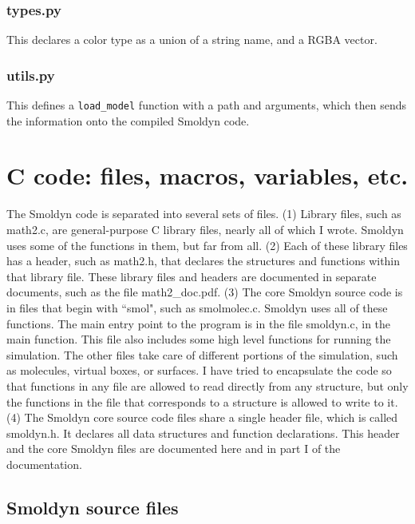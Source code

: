 \documentclass {book}
\newcommand {\ttt} {\texttt}
\begin{document}
\subsection*{types.py}

This declares a color type as a union of a string name, and a RGBA vector.

\subsection*{utils.py}

This defines a \ttt{load\_model} function with a path and arguments, which then sends the information onto the compiled Smoldyn code.


\chapter{C code: files, macros, variables, etc.}

The Smoldyn code is separated into several sets of files. (1) Library files, such as math2.c, are general-purpose C library files, nearly all of which I wrote. Smoldyn uses some of the functions in them, but far from all. (2) Each of these library files has a header, such as math2.h, that declares the structures and functions within that library file. These library files and headers are documented in separate documents, such as the file math2\_doc.pdf. (3) The core Smoldyn source code is in files that begin with ``smol", such as smolmolec.c. Smoldyn uses all of these functions. The main entry point to the program is in the file smoldyn.c, in the main function. This file also includes some high level functions for running the simulation. The other files take care of different portions of the simulation, such as molecules, virtual boxes, or surfaces. I have tried to encapsulate the code so that functions in any file are allowed to read directly from any structure, but only the functions in the file that corresponds to a structure is allowed to write to it. (4) The Smoldyn core source code files share a single header file, which is called smoldyn.h. It declares all data structures and function declarations. This header and the core Smoldyn files are documented here and in part I of the documentation.

\section{Smoldyn source files}
\end{document}
